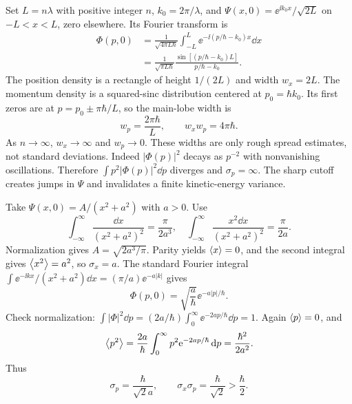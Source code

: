 Set $L=n\lambda$ with positive integer $n$,
$k_0=2\pi/\lambda$, and
$\Psi(x,0)=\ee^{\ii k_0x}/\sqrt{2L}$
on $-L<x<L$, zero elsewhere.
Its Fourier transform is
\begin{align}
\Phi(p,0)
&=\frac1{\sqrt{4\pi L\hbar}}
\int_{-L}^L\ee^{-\ii(p/\hbar-k_0)x}\dd x\\
&=\boxed{\frac1{\sqrt{\pi L\hbar}}
\frac{\sin[(p/\hbar-k_0)L]}{p/\hbar-k_0}}.
\end{align}
The position density is a rectangle of height
$1/(2L)$ and width $w_x=2L$.
The momentum density is a squared-sinc distribution
centered at $p_0=\hbar k_0$.
Its first zeros are at $p=p_0\pm\pi\hbar/L$,
so the main-lobe width is
\begin{equation}
\boxed{w_p=\frac{2\pi\hbar}{L}},\qquad
\boxed{w_xw_p=4\pi\hbar}.
\end{equation}
As $n\to\infty$, $w_x\to\infty$ and
$w_p\to0$. These widths are only
rough spread estimates, not standard deviations.
Indeed $|\Phi(p)|^2$ decays as $p^{-2}$
with nonvanishing oscillations. Therefore
$\int p^2|\Phi(p)|^2\dd p$ diverges and
$\sigma_p=\infty$. The sharp cutoff
creates jumps in $\Psi$ and invalidates a
finite kinetic-energy variance.

Take $\Psi(x,0)=A/(x^2+a^2)$ with $a>0$.
Use
\begin{equation}
\int_{-\infty}^\infty\frac{\dd x}{(x^2+a^2)^2}
=\frac{\pi}{2a^3},
\quad
\int_{-\infty}^\infty\frac{x^2\dd x}{(x^2+a^2)^2}
=\frac{\pi}{2a}.
\end{equation}
Normalization gives
$\boxed{A=\sqrt{2a^3/\pi}}$.
Parity yields $\left\langle x\right\rangle=0$, and the second
integral gives $\left\langle x^2\right\rangle=a^2$,
so $\boxed{\sigma_x=a}$.
The standard Fourier integral
$\int\ee^{-\ii kx}/(x^2+a^2)\dd x
=(\pi/a)\ee^{-a|k|}$ gives
\begin{equation}
\boxed{\Phi(p,0)=
\sqrt{\frac a\hbar}\ee^{-a|p|/\hbar}}.
\end{equation}
Check normalization:
$\int|\Phi|^2\dd p=
(2a/\hbar)\int_0^\infty\ee^{-2ap/\hbar}\dd p=1$.
Again $\left\langle p\right\rangle=0$, and
\begin{equation}
\left\langle p^2\right\rangle=\frac{2a}{\hbar}
\int_0^\infty p^2\mathrm{e}^{-2ap/\hbar}\,\mathrm{d} p
=\frac{\hbar^2}{2a^2}.
\end{equation}
Thus
\begin{equation}
\boxed{\sigma_p=\frac{\hbar}{\sqrt2a}},
\qquad
\boxed{\sigma_x\sigma_p=\frac{\hbar}{\sqrt2}
>\frac{\hbar}{2}}.
\end{equation}

